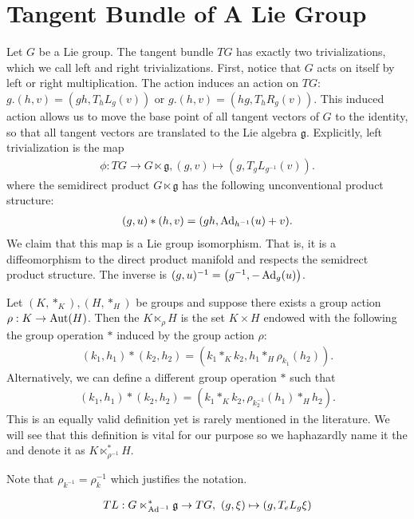 \documentclass[12pt,class=article,crop=false]{standalone}
\begin{document}
\section{Tangent Bundle of A Lie Group}
Let $ G$ be a Lie group. The tangent bundle $ TG$  has exactly two trivializations, which we call left and right trivializations. First, notice that $ G$ acts on itself by left or right multiplication. The action induces an action on $ TG$: $ g.(h,v) = (gh, T_h L_g(v))$ or $ g .(h,v) = (hg, T_hR_g(v))$.  This induced action allows us to move the base point of all tangent vectors of $ G$ to the identity, so that all tangent vectors are translated to the Lie algebra $ \mathfrak{g}$. Explicitly, left trivialization is the map
\begin{align*}
	\phi : TG \to G \ltimes  \mathfrak{g}, (g,v) \mapsto (g, T_g L_{g^{-1}}(v)).
\end{align*}
where the semidirect product $ G \ltimes  \mathfrak{g}$ has the following unconventional product structure:
\begin{align*}
	(g,u) * (h,v) = (gh, \operatorname{Ad}_{h^{-1}}(u) + v).
\end{align*}
We claim that this map is a Lie group isomorphism. That is, it is a diffeomorphism to the direct product manifold and respects the semidrect product structure. The inverse is $ (g,u)^{-1} = \left( g^{-1}, - \operatorname{Ad}_{ g}( u) \right)$.
\begin{defn}
	Let $ (K,*_K), (H,*_H)$ be groups and suppose there exists a group action $ \rho: K \to \operatorname{Aut} (H)$.  Then the  $K \ltimes_\rho H$ is the set $ K \times H$ endowed with the following the group operation $ *$ induced by the group action $ \rho$:
\begin{align*}
(k_1,h_1)*(k_2,h_2) = (k_1 *_K k_2, h_1 *_H \rho_{k_1}(h_2)).
\end{align*}
Alternatively, we can define a different group operation $ *$ such that
\begin{align*}
	(k_1,h_1)*(k_2,h_2) = (k_1 *_K k_2, \rho_{k_2 ^{-1}}(h_1) *_H h_2).
\end{align*}
This is an equally valid definition yet is rarely mentioned in the literature. We will see that this definition is vital for our purpose so we haphazardly name it the  and denote it as $ K \ltimes_{\rho^{-1}}^* H$.
\end{defn}
Note that $ \rho_{k^{-1}} = \rho_k^{-1}$ which justifies the notation.

\begin{defn}
\begin{align*}
	TL: G\ltimes_{ \operatorname{Ad}^{-1}}^*  \mathfrak{ g} \to TG,\ (g,\xi) \mapsto (g,T_eL_g \xi)
\end{align*}
\end{defn}
\end{document}

